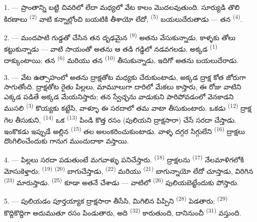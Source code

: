 \VUsaut{1.4mm}
\VUsaut{4.0mm}

1. --- ప్రాంతాన్ని బట్టి  చివరిలో లేదా  మధ్యలో వేట కాలం
మొదలవుతుంది. సూర్యుడి తొలి కిరణాలు  \textsuperscript{(2)} వాటి కన్నాల్లోంచి
బయటికి తీశాయో లేదో,  \textsuperscript{(5)} బయలుదేరుతాడు — తన 
\textsuperscript{(4)}.

2. --- మందపాటి గుడ్డతో చేసిన తన దృఢమైన  \textsuperscript{(9)} అతను
వేసుకున్నాడు, కాళ్ళకు తోలు  కట్టుకున్నాడు — వాటి సాయంతో అతను ఆ తడి
గడ్డిలో నడవగలడు, అక్కడ  \textsuperscript{(1)} దాక్కుంటాయి; తన
 \textsuperscript{(6)} మరియు తన  \textsuperscript{(10)}
తీసుకున్నాడు, ఇదిగో అతను బయలుదేరాడు.

3. --- వేట ఉత్సాహంలో అతను ద్రాక్షతోట మధ్యకు చేరుకుంటాడు, అక్కడ ద్రాక్ష కోత జోరుగా సాగుతోంది.
ద్రాక్షతోట రైతు పిల్లలు, మామూలుగా దారిలో మేకలు కాస్తారు, ఈ రోజు వాటిని ఎక్కడ పడితే అక్కడ
మేయనిస్తారు; తన స్వేచ్ఛను వాడుకుని పారిపోవడంలో వెనకాడని ముసలి 
\textsuperscript{(3)} కొయ్యకు కట్టేసి, వాళ్ళూ ఈ సరదాలో తమ వాటా తీసుకుంటారు. ఒకడు
 \textsuperscript{(12)} ద్రాక్ష గెల తీసుకుని, 
\textsuperscript{(14)} ఒక  \textsuperscript{(13)} పిండి కొత్త రసం (పులియని
ద్రాక్షసారా) చేసే సరదా చేస్తాడు. ఇంకొకడు ఇప్పుడే అల్లిన 
\textsuperscript{(15)} తల అలంకరించుకుంటాడు. వాళ్ళ దగ్గర సిగ్గులేని 
\textsuperscript{(16)} ద్రాక్షలు దొంగిలించేందుకు గానుగ ముందుదాకా వస్తాయి.

4. --- పిల్లలు సరదా పడుతుంటే మగవాళ్ళు పనిచేస్తారు. 
\textsuperscript{(18)} ద్రాక్షలను  \textsuperscript{(17)} నేలమాళిగలోకి
మోసుకెళ్తారు;  \textsuperscript{(19)} 
\textsuperscript{(20)} బాగుచేస్తాడు,  \textsuperscript{(22)} మరియు
 \textsuperscript{(21)} బాగున్నాయో లేదో చూస్తాడు, విరిగిన
 \textsuperscript{(23)} మారుస్తాడు. 
\textsuperscript{(25)} కూడా అతనే చేశాడు — వాటిలో  \textsuperscript{(26)}
పులియబెట్టేందుకు పోస్తారు.

5. --- పులియడం పూర్తయ్యాక ద్రాక్షసారా తీసేసి, మిగిలిన పిప్పిని 
\textsuperscript{(28)} పెడతారు;  \textsuperscript{(29)} కొద్దికొద్దిగా
అదుముతూ రసం పిండుతారు, అది  \textsuperscript{(32)} కారుతుంది, దానినుంచీ
 \textsuperscript{(31)} వస్తుంది.

